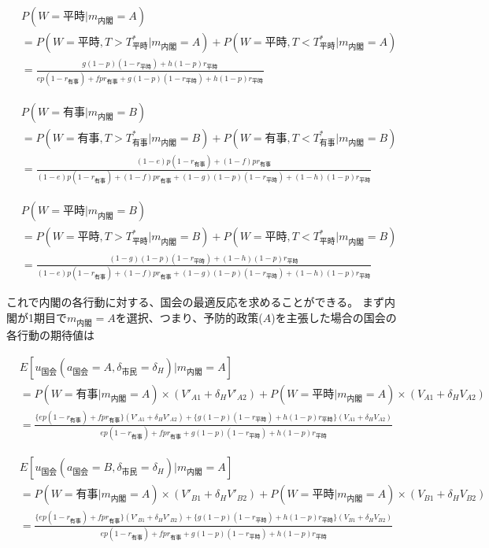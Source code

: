 \documentclass[main.tex]{subfiles}
\begin{document}
\begin{align*}
    & P(W=平時 | m_{内閣}=A)\\[0.5em]
    &= P(W=平時, T>T^*_{平時} | m_{内閣}=A) + P(W=平時, T<T^*_{平時} | m_{内閣}=A)\\[0.5em]
    &= \frac{  g(1-p)(1-r_{平時}) + h(1-p)r_{平時}  }{ ep(1-r_{有事}) + fpr_{有事} + g(1-p)(1-r_{平時}) + h(1-p)r_{平時} }
\end{align*}

\begin{align*}
    & P(W=有事 | m_{内閣}=B)\\[0.5em]
    &= P(W=有事, T>T^*_{有事} | m_{内閣}=B) + P(W=有事, T<T^*_{有事} | m_{内閣}=B)\\[0.5em]
    &= \frac{ (1-e)p(1-r_{有事}) +  (1-f)pr_{有事} }{ (1-e)p(1-r_{有事}) + (1-f)pr_{有事} + (1-g)(1-p)(1-r_{平時}) + (1-h)(1-p)r_{平時} }
\end{align*}

\begin{align*}
    & P(W=平時 | m_{内閣}=B)\\[0.5em]
    &= P(W=平時, T>T^*_{平時} | m_{内閣}=B) + P(W=平時, T<T^*_{平時} | m_{内閣}=B)\\[0.5em]
    &= \frac{ (1-g)(1-p)(1-r_{平時}) + (1-h)(1-p)r_{平時} }{ (1-e)p(1-r_{有事}) + (1-f)pr_{有事} + (1-g)(1-p)(1-r_{平時}) + (1-h)(1-p)r_{平時} }
\end{align*}

\bigskip
これで内閣の各行動に対する、国会の最適反応を求めることができる。
まず内閣が1期目で$m_{内閣}=A$を選択、つまり、予防的政策($A$)を主張した場合の国会の各行動の期待値は

\begin{align*}
    & E[u_{国会}(a_{国会}=A, \delta_{市民}=\delta_H) | m_{内閣} = A  ]\\[0.5em]
    &= P(W=有事 | m_{内閣}=A) × (V'_{A1} + \delta_H V'_{A2}) + P(W=平時 | m_{内閣}=A) × (V_{A1} + \delta_H V_{A2})\\[0.5em]
    &= \frac{ \{ep(1-r_{有事}) +  fpr_{有事}\}(V'_{A1} + \delta_H V'_{A2}) +  \{g(1-p)(1-r_{平時}) + h(1-p)r_{平時}\}(V_{A1} + \delta_H V_{A2})  }{ ep(1-r_{有事}) + fpr_{有事} + g(1-p)(1-r_{平時}) + h(1-p)r_{平時} }
\end{align*}

\begin{align*}
    & E[u_{国会}(a_{国会}=B, \delta_{市民}=\delta_H) | m_{内閣} = A  ]\\[0.5em]
    &= P(W=有事 | m_{内閣}=A) × (V'_{B1} + \delta_H V'_{B2}) + P(W=平時 | m_{内閣}=A) × (V_{B1} + \delta_H V_{B2})\\[0.5em]
    &= \frac{ \{ep(1-r_{有事}) +  fpr_{有事}\}(V'_{B1} + \delta_H V'_{B2}) +  \{g(1-p)(1-r_{平時}) + h(1-p)r_{平時}\}(V_{B1} + \delta_H V_{B2})  }{ ep(1-r_{有事}) + fpr_{有事} + g(1-p)(1-r_{平時}) + h(1-p)r_{平時} }
\end{align*}
\end{document}
